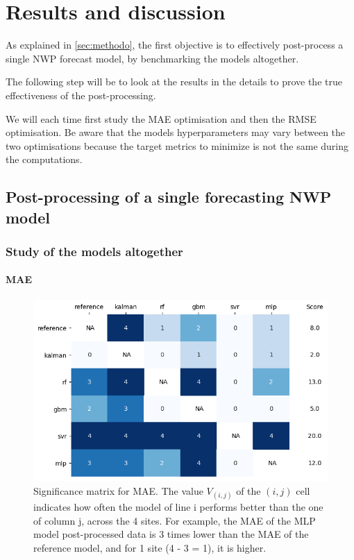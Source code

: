 \section{Results and discussion}

As explained in \autoref{sec:methodo}, the first objective is to effectively post-process a single NWP forecast model, by benchmarking the models altogether. 

The following step will be to look at the results in the details to prove the true effectiveness of the post-processing.

We will each time first study the MAE optimisation and then the RMSE optimisation. Be aware that the models hyperparameters may vary between the two optimisations because the 
target metrics to minimize is not the same during the computations.
\subsection{Post-processing of a single forecasting NWP model}
\subsubsection{Study of the models altogether} 
\paragraph{MAE}\indent
\begin{figure}[htb!]
    \centering
    \includegraphics[width=\columnwidth]{figures/first_study/significance_matrix_mae.png}
\caption{Significance matrix for MAE. The value $V_{(i,j)}$ of the $(i,j)$ cell indicates how often the model of line i performs better than the one of column j, across the 
4 sites. For example, the MAE of the MLP model post-processed data is 3 times lower than the MAE of the reference model, and for 1 site (4 - 3 = 1), it is higher.}
\label{fig:sig_mae}
\end{figure}

